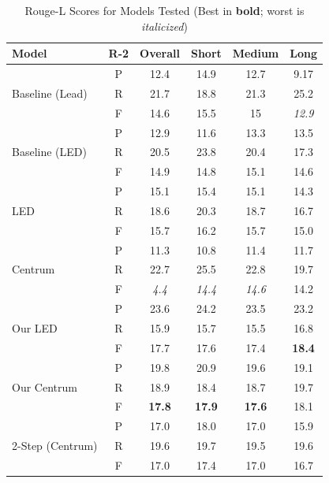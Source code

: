 \documentclass[12pt, twocolumn]{article}
\numberwithin{equation}{section}
\begin{document}
\begin{table}
    \centering
    \footnotesize
    \begin{tabular}{|p{1.5cm}|c|c|c|c|c|}
    \hline
        Model & R-2 & Overall & Short & Medium & Long \\ \hline
        \multirow{3}{1.5cm}{Baseline (Lead)}
	& P & 12.4 & 14.9 & 12.7 & 9.17 \\ \cline{2-6}
        & R & 21.7 & 18.8 & 21.3 & 25.2 \\ \cline{2-6}
        & F & 14.6 & 15.5 & 15 & \textit{12.9} \\ \hline
        \multirow{3}{1.5cm}{Baseline (LED)} 
	& P & 12.9 & 11.6 & 13.3 & 13.5 \\ \cline{2-6}
        & R & 20.5 & 23.8 & 20.4 & 17.3 \\ \cline{2-6}
        & F & 14.9 & 14.8 & 15.1 & 14.6 \\ \hline
        \multirow{3}{1.5cm}{LED} 
	& P & 15.1 & 15.4 & 15.1 & 14.3 \\ \cline{2-6}
        & R & 18.6 & 20.3 & 18.7 & 16.7 \\ \cline{2-6}
        & F & 15.7 & 16.2 & 15.7 & 15.0 \\ \hline
        \multirow{3}{1.5cm}{Centrum} 
	& P & 11.3 & 10.8 & 11.4 & 11.7 \\ \cline{2-6}
        & R & 22.7 & 25.5 & 22.8 & 19.7 \\ \cline{2-6}
        & F & \textit{4.4} & \textit{14.4} & \textit{14.6} & 14.2 \\ \hline
        \multirow{3}{1.5cm}{Our LED} 
	& P & 23.6 & 24.2 & 23.5 & 23.2 \\ \cline{2-6}
        & R & 15.9 & 15.7 & 15.5 & 16.8 \\ \cline{2-6}
        & F & 17.7 & 17.6 & 17.4 & \textbf{18.4} \\ \hline
        \multirow{3}{1.5cm}{Our Centrum} 
	& P & 19.8 & 20.9 & 19.6 & 19.1 \\ \cline{2-6}
        & R & 18.9 & 18.4 & 18.7 & 19.7 \\ \cline{2-6}
        & F & \textbf{17.8} & \textbf{17.9} & \textbf{17.6} & 18.1 \\ \hline
        \multirow{3}{1.5cm}{2-Step (Centrum)} 
	& P & 17.0 & 18.0 & 17.0 & 15.9 \\ \cline{2-6}
        & R & 19.6 & 19.7 & 19.5 & 19.6 \\ \cline{2-6}
        & F & 17.0 & 17.4 & 17.0 & 16.7 \\ \hline
    \end{tabular}
    \caption{Rouge-L Scores for Models Tested (Best in \textbf{bold}; worst is \textit{italicized})}
    \label{tab:rouge-l}
\end{table}
\end{document}
